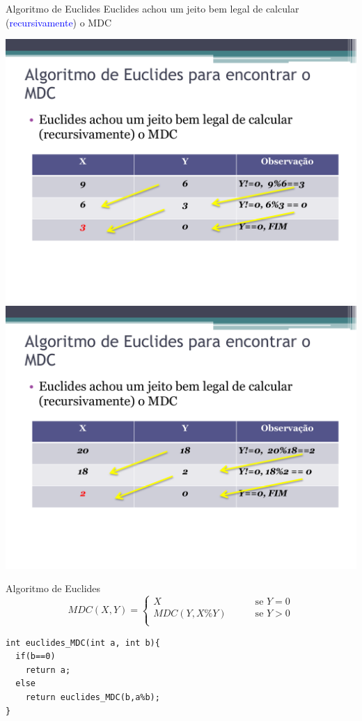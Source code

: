 \documentclass{beamer}
\newcommand{\blue}[1]{\textcolor{blue}{#1}}
\begin{document}
\begin{frame}{Algoritmo de Euclides}
Euclides achou um jeito bem legal de calcular (\blue{recursivamente}) o MDC
\begin{center}
\includegraphics[scale=0.5]{img/euc}
\\
\includegraphics[scale=0.5]{img/euc2}
\end{center}
\end{frame}

\begin{frame}[fragile]{Algoritmo de Euclides}
\[
MDC(X,Y) = \left\{
\begin{array}{lll}
X & \quad & \mbox{ se  } Y = 0 \\
MDC(Y,X\%Y) & \quad & \mbox{ se  } Y > 0 \\
\end{array}
\right.
\]
\begin{lstlisting}
int euclides_MDC(int a, int b){
  if(b==0)
    return a;
  else
    return euclides_MDC(b,a%b);
}
\end{lstlisting}

\end{frame}
\end{document}
